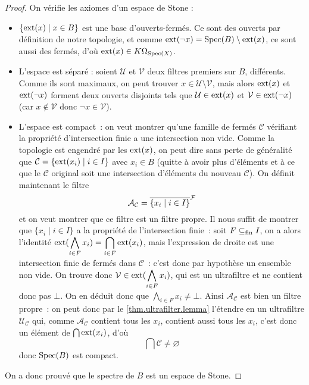 \begin{proof}
  On vérifie les axiomes d'un espace de Stone :
  \begin{itemize}
  \item $\{\operatorname{ext}(x)\mid x \in B\}$ est une base d'ouverts-fermés. Ce sont des
    ouverts par définition de notre topologie, et comme
    $\operatorname{ext}(\lnot x)=\operatorname{Spec}(B)\setminus\operatorname{ext}(x)$, ce sont aussi des fermés, d'où
    $\operatorname{ext}(x)\in K\Omega_{\operatorname{Spec}(X)}$.
  \item L'espace est séparé : soient $\mathcal U$ et $\mathcal V$ deux filtres
    premiers sur $B$, différents. Comme ils sont maximaux, on peut trouver
    $x\in \mathcal U\setminus \mathcal V$, mais alors $\operatorname{ext}(x)$ et
    $\operatorname{ext}(\lnot x)$ forment deux ouverts disjoints tels que
    $\mathcal U \in\operatorname{ext}(x)$ et $\mathcal V \in\operatorname{ext}(\lnot x)$
    (car $x\notin\mathcal V$ donc $\lnot x \in \mathcal V$).
  \item L'espace est compact~: on veut montrer qu'une famille de fermés
    $\mathcal C$ vérifiant la propriété d'intersection finie a une
    intersection non vide. Comme la topologie est engendré par les $\operatorname{ext}(x)$,
    on peut dire sans perte de généralité que
    $\mathcal C = \{\operatorname{ext}(x_i)\mid i\in I\}$ avec $x_i \in B$ (quitte à
    avoir plus d'éléments et à ce que le $\mathcal C$ original soit une
    intersection d'éléments du nouveau $\mathcal C$). On définit maintenant le
    filtre
    \[\mathcal A_\mathcal C = \overline{\{x_i\mid i \in I\}}^{\mathcal F}\]
    et on veut montrer que ce filtre est un filtre propre. Il nous suffit de
    montrer que $\{x_i\mid i \in I\}$ a la propriété de l'intersection finie~:
    soit $F\subseteq_{\mathrm{fin}} I$, on a alors l'identité
    $\displaystyle\operatorname{ext}(\bigwedge_{i \in F} x_i) = \bigcap_{i \in F}\operatorname{ext}(x_i)$,
    mais l'expression de droite est une intersection finie de fermés dans
    $\mathcal C$~: c'est donc par hypothèse un ensemble non vide. On trouve
    donc $\mathcal V \in \displaystyle\operatorname{ext}(\bigwedge_{i\in F} x_i)$, qui est un
    ultrafiltre et ne contient donc pas $\bot$. On en déduit donc que
    $\displaystyle\bigwedge_{i \in F} x_i \neq \bot$. Ainsi
    $\mathcal A_\mathcal C$ est bien un filtre propre~: on peut donc par le
    \cref{thm.ultrafilter.lemma} l'étendre en un ultrafiltre
    $\mathcal U_\mathcal C$ qui, comme $\mathcal A_\mathcal C$ contient tous les
    $x_i$, contient aussi tous les $x_i$, c'est donc un élément de
    $\bigcap \operatorname{ext}(x_i)$, d'où
    \[\bigcap \mathcal C \neq \varnothing\]
    donc $\operatorname{Spec}(B)$ est compact.
  \end{itemize}
  On a donc prouvé que le spectre de $B$ est un espace de Stone.
\end{proof}

